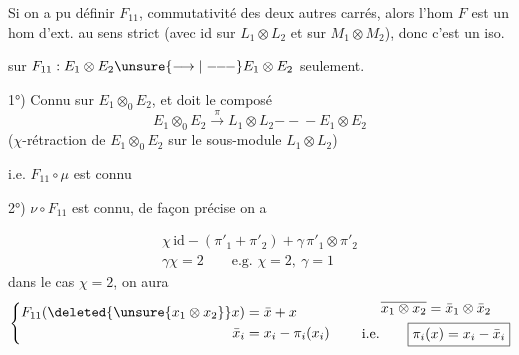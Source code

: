 
Si on a pu définir $F_{11}$,  commutativité des deux autres carrés, alors l'hom $F$ est un hom d'ext. au sens strict (avec id sur $L_1\otimes L_2$ et sur $M_1\otimes M_2$), donc c'est un iso.

 sur $F_{11}:E_1\otimes E_2\unsure{\longrightarrow|\mathrel{-\!\!-\!\!-}}E_1\otimes E_2$ seulement.

1°) Connu sur $E_1\otimes_0 E_2$, et doit  le composé
\[
 E_1\otimes_0 E_2\xrightarrow{\pi}L_1\otimes L_2\mathrel{-\!\!-\!\!-}E_1\otimes E_2
\]
($\chi$-rétraction de $E_1\otimes_0 E_2$ sur le sous-module $L_1\otimes L_2$)

i.e. $F_{11}\circ\mu$ est connu

2°) $\nu\circ F_{11}$ est connu, de façon précise on a



\[
 \boxed{\begin{gathered}
 \chi\,\mathrm{id}-(\pi'_1+\pi'_2)+\gamma\,\pi'_1\otimes\pi'_2\\
 \gamma\chi=2\qquad\text{e.g. }\chi=2,\ \gamma=1
 \end{gathered}}
\]
dans le cas $\chi=2$, on aura
\[
 \left\{\begin{aligned}
 F_{11}(\deleted{\unsure{x_1\otimes x_2}}x)&=\bar x+x\\
 \bar x_i&=x_i-\pi_i(x_i)
 \end{aligned}\right.
 \qquad
 \begin{gathered}
 \overline{x_1\otimes x_2}=\bar x_1\otimes\bar x_2\\
 \text{i.e.}\qquad \boxed{\pi_i(x)=x_i-\bar x_i}
 \end{gathered}
\]



